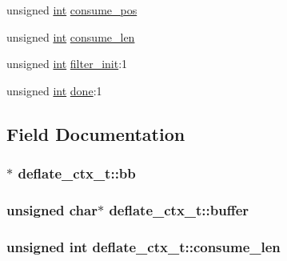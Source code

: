 \begin{DoxyCompactItemize}
\item 
unsigned \hyperlink{pcre_8txt_a42dfa4ff673c82d8efe7144098fbc198}{int} \hyperlink{structdeflate__ctx__t_a63a8e0c779c959ec5df6b1cd86604a64}{consume\+\_\+pos}
\item 
unsigned \hyperlink{pcre_8txt_a42dfa4ff673c82d8efe7144098fbc198}{int} \hyperlink{structdeflate__ctx__t_a8ee6e8d04caf402d122da5063b333eed}{consume\+\_\+len}
\item 
unsigned \hyperlink{pcre_8txt_a42dfa4ff673c82d8efe7144098fbc198}{int} \hyperlink{structdeflate__ctx__t_a3ee770cbce026c565f5de2c0581b0e81}{filter\+\_\+init}\+:1
\item 
unsigned \hyperlink{pcre_8txt_a42dfa4ff673c82d8efe7144098fbc198}{int} \hyperlink{structdeflate__ctx__t_ab01d0ef31b0ca740151d67eb77074ef2}{done}\+:1
\end{DoxyCompactItemize}


\subsection{Field Documentation}
\subsubsection[{\texorpdfstring{bb}{bb}}]{$\ast$ deflate\+\_\+ctx\+\_\+t\+::bb}\hypertarget{structdeflate__ctx__t_a46db9bdb2455b8b07131e9d86ece12e6}{}\label{structdeflate__ctx__t_a46db9bdb2455b8b07131e9d86ece12e6}
\subsubsection[{\texorpdfstring{buffer}{buffer}}]{\setlength{\rightskip}{0pt plus 5cm}unsigned char$\ast$ deflate\+\_\+ctx\+\_\+t\+::buffer}\hypertarget{structdeflate__ctx__t_ac1c0564ce03d6f7feec2f79932be3a6a}{}\label{structdeflate__ctx__t_ac1c0564ce03d6f7feec2f79932be3a6a}
\subsubsection[{\texorpdfstring{consume\+\_\+len}{consume_len}}]{\setlength{\rightskip}{0pt plus 5cm}unsigned {\bf int} deflate\+\_\+ctx\+\_\+t\+::consume\+\_\+len}\hypertarget{structdeflate__ctx__t_a8ee6e8d04caf402d122da5063b333eed}{}\label{structdeflate__ctx__t_a8ee6e8d04caf402d122da5063b333eed}
